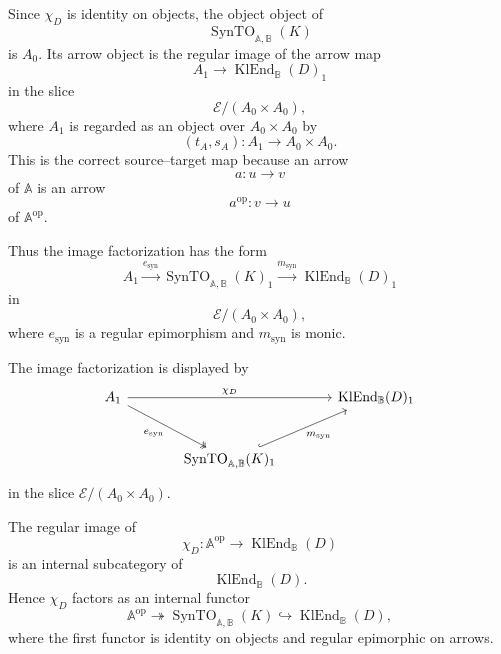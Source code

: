 Since \(\chi_D\) is identity on objects, the object object of
\[
    \operatorname{SynTO}_{\mathbb A,\mathbb B}(K)
\]
is \(A_0\). Its arrow object is the regular image of the arrow map
\[
    A_1\to\operatorname{KlEnd}_{\mathbb B}(D)_1
\]
in the slice
\[
    \mathcal E/(A_0\times A_0),
\]
where \(A_1\) is regarded as an object over \(A_0\times A_0\) by
\[
    (t_A,s_A):A_1\to A_0\times A_0.
\]
This is the correct source--target map because an arrow
\[
    a:u\to v
\]
of \(\mathbb A\) is an arrow
\[
    a^{\mathrm{op}}:v\to u
\]
of \(\mathbb A^{\mathrm{op}}\).

Thus the image factorization has the form
\[
    A_1
        \xrightarrow{e_{\mathrm{syn}}}
    \operatorname{SynTO}_{\mathbb A,\mathbb B}(K)_1
        \xrightarrow{m_{\mathrm{syn}}}
    \operatorname{KlEnd}_{\mathbb B}(D)_1
\]
in
\[
    \mathcal E/(A_0\times A_0),
\]
where \(e_{\mathrm{syn}}\) is a regular epimorphism and
\(m_{\mathrm{syn}}\) is monic.

The image factorization is displayed by
\[
\begin{tikzcd}[column sep=large, row sep=large]
    A_1
        \arrow[rr, "{\chi_D}"]
        \arrow[dr, two heads, "{e_{\mathrm{syn}}}"']
    &&
    \operatorname{KlEnd}_{\mathbb B}(D)_1
    \\
    &
    \operatorname{SynTO}_{\mathbb A,\mathbb B}(K)_1
        \arrow[ur, hook, "{m_{\mathrm{syn}}}"']
    &
\end{tikzcd}
\]
in the slice \(\mathcal E/(A_0\times A_0)\).

\begin{theorem}
\label{thm:syn-to-image-subcategory}
    The regular image of
    \[
        \chi_D:
        \mathbb A^{\mathrm{op}}
        \to
        \operatorname{KlEnd}_{\mathbb B}(D)
    \]
    is an internal subcategory of
    \[
        \operatorname{KlEnd}_{\mathbb B}(D).
    \]
    Hence \(\chi_D\) factors as an internal functor
    \[
        \mathbb A^{\mathrm{op}}
            \twoheadrightarrow
        \operatorname{SynTO}_{\mathbb A,\mathbb B}(K)
            \hookrightarrow
        \operatorname{KlEnd}_{\mathbb B}(D),
    \]
    where the first functor is identity on objects and regular epimorphic on
    arrows.
\end{theorem}

